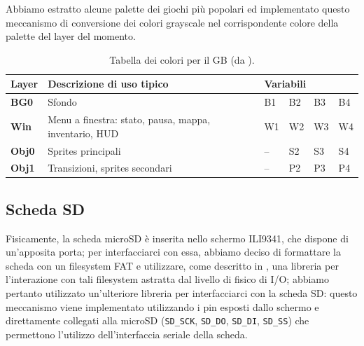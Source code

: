 \documentclass[hidelinks,12pt]{article}
\begin{document}
Abbiamo estratto alcune palette dei giochi più popolari ed implementato questo
meccanismo di conversione dei colori grayscale nel corrispondente colore della
palette del layer del momento.

\begin{table}[h]
	\begin{tabular}{|l|l|llll|}
		\hline
		\textbf{Layer} & \textbf{Descrizione di uso tipico}                    & \multicolumn{4}{l|}{\textbf{Variabili}}                                                          \\ \hline
		\textbf{BG0}   & Sfondo                                                & \multicolumn{1}{l|}{B1}                 & \multicolumn{1}{l|}{B2} & \multicolumn{1}{l|}{B3} & B4 \\ \hline
		\textbf{Win}   & Menu a finestra: stato, pausa, mappa, inventario, HUD & \multicolumn{1}{l|}{W1}                 & \multicolumn{1}{l|}{W2} & \multicolumn{1}{l|}{W3} & W4 \\ \hline
		\textbf{Obj0}  & Sprites principali                                    & \multicolumn{1}{l|}{–}                  & \multicolumn{1}{l|}{S2} & \multicolumn{1}{l|}{S3} & S4 \\ \hline
		\textbf{Obj1}  & Transizioni, sprites secondari                        & \multicolumn{1}{l|}{–}                  & \multicolumn{1}{l|}{P2} & \multicolumn{1}{l|}{P3} & P4 \\ \hline
	\end{tabular}
	\caption{Tabella dei colori per il GB (da
		\cite{GameBoyColors}).}
	\label{table:gb_colors}
\end{table}

\subsection{Scheda SD}
Fisicamente, la scheda microSD è inserita nello schermo ILI9341, che dispone di
un'apposita porta; per interfacciarci con essa, abbiamo deciso di formattare la
scheda con un filesystem FAT e utilizzare, come descritto in \cite{stm1721}, una
libreria per l'interazione con tali filesystem astratta dal livello di fisico di
I/O; abbiamo pertanto utilizzato un'ulteriore libreria per interfacciarci con
la scheda SD: questo meccanismo viene implementato utilizzando i pin esposti
dallo schermo e direttamente collegati alla microSD (\texttt{SD\_SCK},
\texttt{SD\_DO}, \texttt{SD\_DI}, \texttt{SD\_SS}) che permettono l'utilizzo
dell'interfaccia seriale della scheda.
\end{document}
